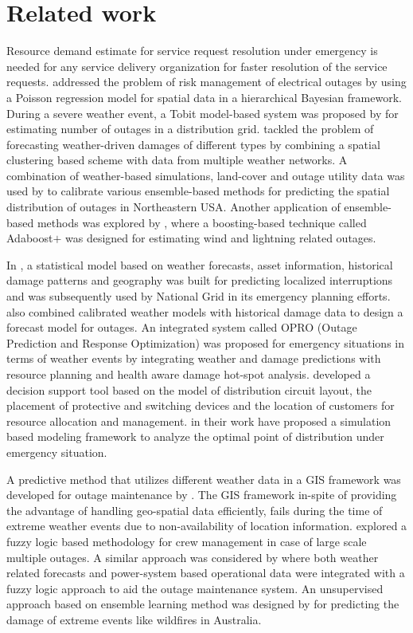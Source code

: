 \documentclass[twoside,leqno,twocolumn]{article}
\begin{document}
\section{Related work}
\label{sec:literature}
Resource demand estimate for service request resolution under emergency is needed for any service delivery organization for faster resolution of the service requests. \cite{H.Li} addressed the problem of risk management of electrical outages by using a Poisson regression model for spatial data in a hierarchical Bayesian framework. During a severe weather event, a Tobit model-based system was proposed by \cite{Amith} for estimating number of outages in a distribution grid. \cite{Zhiguo} tackled the problem of forecasting weather-driven damages of different types by combining a spatial clustering based scheme with data from multiple weather networks. A combination of weather-based simulations, land-cover and outage utility data was used by \cite{Wanik} to calibrate various ensemble-based methods for predicting the spatial distribution of outages in Northeastern USA. Another application of ensemble-based methods was explored by \cite{Padm}, where a boosting-based technique called Adaboost$+$ was designed for estimating wind and lightning related outages.
\par
In \cite{Mallik}, a statistical model based on weather forecasts, asset information, historical damage patterns and geography was built for predicting localized interruptions  and was subsequently used by National Grid in its emergency planning efforts. \cite{Trenish} also combined calibrated weather models with historical damage data to design a forecast model for outages. An integrated system called OPRO (Outage Prediction and Response Optimization) \cite{OPRO} was proposed for emergency situations in terms of weather events by integrating weather and damage predictions with resource planning and health aware damage hot-spot analysis. \cite{Lubkeman} developed a decision support tool based on the model of distribution circuit layout, the placement of protective and switching devices and the location of customers for resource allocation and management. \cite{Lee2009} in their work have proposed a simulation based modeling framework to analyze the optimal point of distribution under emergency situation. 
\par
A predictive method that utilizes different weather data in a GIS framework was developed for outage maintenance by \cite{Chen}. The GIS framework in-spite of providing the advantage of handling geo-spatial data efficiently, fails during the time of extreme weather events due to non-availability of location information. \cite{Wu} explored a fuzzy logic based methodology for crew management in case of large scale multiple outages. A similar approach was considered by \cite{PCChen} where both weather related forecasts and power-system based operational data were integrated with a fuzzy logic approach to aid the outage maintenance system. An unsupervised approach based on ensemble learning method was designed by \cite{Salehi} for predicting the damage of extreme events like wildfires in Australia. 
\end{document}
